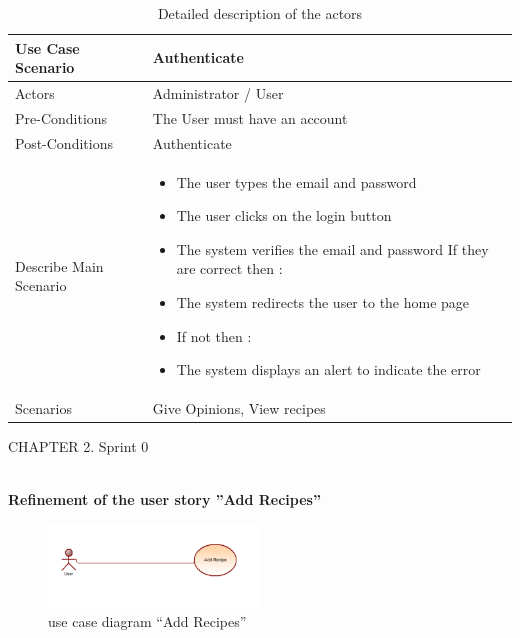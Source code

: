 \documentclass{article}
\begin{document}
{\begin{table}[h]
    \centering
    \begin{tabularx}{\textwidth}{X|X}
        \toprule
        Use Case Scenario & Authenticate \\
        \midrule
        Actors & Administrator / User \\
        \midrule
        Pre-Conditions & The User must have an account \\
        \midrule
        Post-Conditions & Authenticate \\
        \midrule
        Describe Main Scenario &  \begin{itemize}[label=$\bullet$]
            \item The user types the email and password
            \item The user clicks on the login button
            \item The system verifies the email and password If they are correct then :
            \item The system redirects the user to the home page 
            \item If not then :
	  \item The system displays an alert to indicate the error
        \end{itemize} \\
        \midrule
        Scenarios &  Give Opinions, View recipes \\
        \bottomrule
    \end{tabularx}
    \caption{Detailed description of the actors}
    \label{tab:actors_roles}
\end{table}
\newpage
\noindent
CHAPTER 2.  Sprint 0 \\
\underline{\hspace{\textwidth}} \vspace{0.2cm}\\
{\large \textbf{Refinement of the user story ”Add Recipes”}
\begin{figure}[htbp]
    \centering
    \includegraphics[width=0.5\textwidth]{Addrecipee}
    \caption{use case diagram “Add Recipes”}
    \label{fig:design2}
\end{figure}
\begin{table}[h]

\end{table}}}
\end{document}
